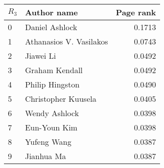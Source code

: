 \begin{tabular}{llr}
\toprule
\(R_3\) &              Author name &  Page rank\\
\midrule
0 &           Daniel Ashlock &              0.1713 \\
1 &  Athanasios V. Vasilakos &              0.0743 \\
2 &                Jiawei Li &              0.0492 \\
3 &           Graham Kendall &              0.0492 \\
4 &          Philip Hingston &              0.0490 \\
5 &      Christopher Kuusela &              0.0405 \\
6 &            Wendy Ashlock &              0.0398 \\
7 &             Eun-Youn Kim &              0.0398 \\
8 &              Yufeng Wang &              0.0387 \\
9 &               Jianhua Ma &              0.0387 \\
\bottomrule
\end{tabular}
